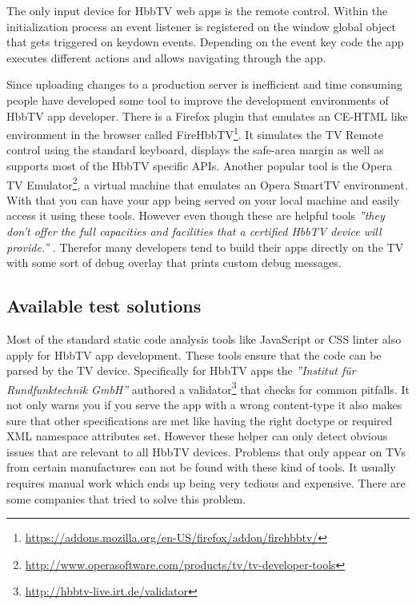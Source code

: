 The only input device for HbbTV web apps is the remote control. Within the initialization process
an event listener is registered on the window global object that gets triggered on keydown events.
Depending on the event key code the app executes different actions and allows navigating through
the app.

Since uploading changes to a production server is inefficient and time consuming people have
developed some tool to improve the development environments of HbbTV app developer. There is a
Firefox plugin that emulates an CE-HTML like environment in the browser called FireHbbTV\footnote{\url{https://addons.mozilla.org/en-US/firefox/addon/firehbbtv/}}.
It simulates the TV Remote control using the standard keyboard, displays the safe-area margin as well
as supports most of the HbbTV specific APIs. Another popular tool is the Opera TV Emulator\footnote{\url{http://www.operasoftware.com/products/tv/tv-developer-tools}},
a virtual machine that emulates an Opera SmartTV environment. With that you can have your app being
served on your local machine and easily access it using these tools. However even though these are
helpful tools \textit{''they don't offer the full capacities and facilities that a certified HbbTV
device will provide.''} \cite{hbbtvenv}. Therefor many developers tend to build their apps directly
on the TV with some sort of debug overlay that prints custom debug messages.

\subsection{Available test solutions\label{sec:availabletestsolutions}}

Most of the standard static code analysis tools like JavaScript or CSS linter also apply for HbbTV app
development. These tools ensure that the code can be parsed by the TV device. Specifically for
HbbTV apps the \textit{''Institut für Rundfunktechnik GmbH''} authored a validator\footnote{\url{http://hbbtv-live.irt.de/validator}} that checks
for common pitfalls. It not only warns you if you serve the app with a wrong content-type
it also makes sure that other specifications are met like having the right doctype or required
XML namespace attributes set. However these helper can only detect obvious issues that are relevant
to all HbbTV devices. Problems that only appear on TVs from certain manufactures can not be found
with these kind of tools. It usually requires manual work which ends up being very tedious and
expensive. There are some companies that tried to solve this problem.

